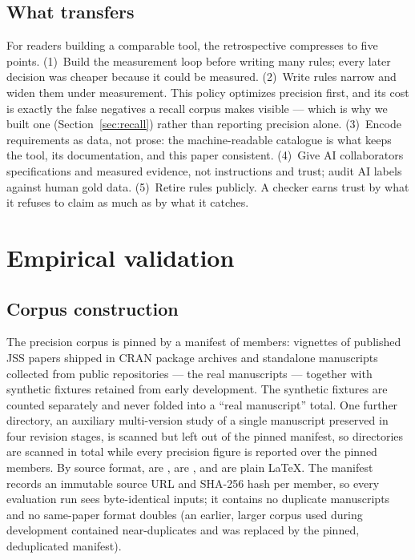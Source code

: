 \documentclass[nojss,article]{jss}
\begin{document}
\subsection{What transfers}
\label{sec:lessons}

For readers building a comparable tool, the retrospective compresses
to five points. (1)~Build the measurement loop before writing many
rules; every later decision was cheaper because it could be measured.
(2)~Write rules narrow and widen them under measurement. This policy
optimizes precision first, and its cost is exactly the false
negatives a recall corpus makes visible --- which is why we built one
(Section~\ref{sec:recall}) rather than reporting precision alone.
(3)~Encode requirements as data, not prose: the machine-readable
catalogue is what keeps the tool, its documentation, and this paper
consistent. (4)~Give AI collaborators specifications and measured
evidence, not instructions and trust; audit AI labels against human
gold data. (5)~Retire rules publicly. A checker earns trust by what
it refuses to claim as much as by what it catches.

\section{Empirical validation}
\label{sec:validation}

\subsection{Corpus construction}
\label{sec:corpus}

The precision corpus is pinned by a manifest of \StatCorpusPinned{}
members: \StatCorpusCran{} vignettes of published JSS papers shipped
in CRAN package archives and \StatCorpusGithub{} standalone
manuscripts collected from public repositories --- the real
manuscripts --- together with \StatCorpusSynthetic{} synthetic
fixtures retained from early development. The synthetic fixtures are
counted separately and never folded into a ``real manuscript'' total.
One further directory, an auxiliary multi-version study of a single
manuscript preserved in four revision stages, is scanned but left out
of the pinned manifest, so \StatCorpusScanned{} directories are
scanned in total while every precision figure is reported over the
\StatCorpusPinned{} pinned members. By source format,
\StatCorpusRnw{} are , \StatCorpusRmd{} are ,
and \StatCorpusTex{} are plain \LaTeX{}. The manifest records an
immutable source URL and SHA-256 hash per member, so every evaluation
run sees byte-identical inputs; it contains no duplicate manuscripts
and no same-paper format doubles (an earlier, larger corpus used
during development contained near-duplicates and was replaced by the
pinned, deduplicated manifest).
\end{document}

